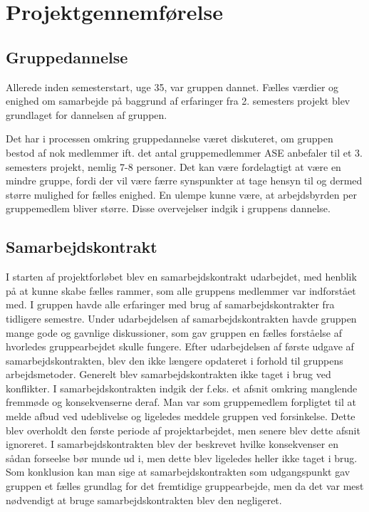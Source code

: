 \chapter{Projektgennemførelse}
\section{Gruppedannelse}
Allerede inden semesterstart, uge 35, var gruppen dannet. Fælles værdier og enighed om samarbejde på baggrund af erfaringer fra 2. semesters projekt blev grundlaget for dannelsen af gruppen.

Det har i processen omkring gruppedannelse været diskuteret, om gruppen bestod af nok medlemmer ift. det antal gruppemedlemmer ASE anbefaler til et 3. semesters projekt, nemlig 7-8 personer. Det kan være fordelagtigt at være en mindre gruppe, fordi der vil være færre synspunkter at tage hensyn til og 
dermed større mulighed for fælles enighed. En ulempe kunne være, at arbejdsbyrden per gruppemedlem bliver større. Disse overvejelser indgik i gruppens dannelse.\\

\section{Samarbejdskontrakt}
I starten af projektforløbet blev en samarbejdskontrakt udarbejdet, med henblik på at kunne skabe fælles rammer, som alle gruppens medlemmer var indforstået
 med. I gruppen havde alle erfaringer med brug af samarbejdskontrakter fra tidligere semestre. Under udarbejdelsen af samarbejdskontrakten havde gruppen mange gode og gavnlige diskussioner, som gav gruppen en 
 fælles forståelse af hvorledes gruppearbejdet skulle fungere. Efter udarbejdelsen af første udgave af samarbejdskontrakten, blev den ikke længere opdateret i 
 forhold til gruppens arbejdsmetoder. Generelt blev samarbejdskontrakten ikke taget i brug ved konflikter. I samarbejdskontrakten indgik der f.eks. et afsnit 
 omkring manglende fremmøde og konsekvenserne deraf. Man var som gruppemedlem forpligtet til at melde afbud ved udeblivelse og ligeledes meddele gruppen ved 
 forsinkelse. Dette blev overholdt den første periode af projektarbejdet, men senere blev dette afsnit ignoreret. I samarbejdskontrakten blev der beskrevet 
 hvilke konsekvenser en sådan forseelse bør munde ud i, men dette blev ligeledes heller ikke taget i brug. Som konklusion kan man sige at samarbejdskontrakten 
 som udgangspunkt gav gruppen et fælles grundlag for det fremtidige gruppearbejde, men da det var mest nødvendigt at bruge samarbejdskontrakten blev den 
 negligeret.
 
